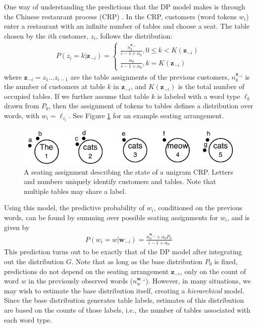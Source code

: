 \documentclass[11pt]{article}
\begin{document}
One way of understanding the predictions that the DP model makes is through the Chinese restaurant process (CRP)
\cite{aldous85}. 
In the CRP, customers (word tokens $w_i$) enter a restaurant with an infinite number of tables and choose a seat.  
The table chosen by the $i$th customer, $z_i$, follows the distribution:
\begin{align}
\nonumber P(z_i = k | \mathbf{z}_{-i}) = \left\{ 
\begin{array}{ll} 
  \frac{n_k^{\mathbf{z}_{-i}}}{i - 1 + \alpha_0}, 0 \leq k < K(\mathbf{z}_{-i}) \\
  \frac{\alpha_0}{i - 1 + \alpha_0}, k = K(\mathbf{z}_{-i})
\end{array} \right.
\label{eqn:crp}
\end{align}
where $\mathbf{z}_{-i} = z_1 \dots z_{i-1}$ are the table assignments of the previous customers, $n_k^{\mathbf{z}_{-i}}$ is the number of customers at table $k$ in ${\mathbf{z}_{-i}}$, and $K(\mathbf{z}_{-i})$ is
the total number of occupied tables.  
If we further assume that table $k$ is labeled with a word type $\ell_k$ drawn from $P_0$, then the assignment of tokens to tables defines a distribution over words, with $w_i = \ell_{z_i}$.
See Figure \ref{fig:tables} for an example seating arrangement.  

\begin{figure}
\begin{center}
\includegraphics[width=1.0\columnwidth]{tables.pdf}
\end{center}
\caption[]{A seating assignment describing the state of a unigram CRP. Letters and numbers uniquely identify customers and tables. Note that multiple tables may share a label.}
\label{fig:tables}
\end{figure}


Using this model, the predictive probability of $w_i$, conditioned on
the previous words, can be found by summing over possible seating
assignments for $w_i$, and is given by
\begin{align}
P(w_i = w | \mathbf{w}_{-i}) = \frac{n_{w}^{\mathbf{w}_{-i}} + \alpha_0 P_0}{i-1 + \alpha_0}
\end{align}
This prediction turns out to be exactly that of the DP model after integrating out the distribution $G$.  
Note that as long as the base distribution $P_0$ is fixed, predictions do not depend on the seating arrangement $\mathbf{z}_{-i}$, only on the count of word $w$ in the previously observed words ($n_{w}^{\mathbf{w}_{-i}}$).  
However, in many situations, we may wish to estimate the base distribution itself, creating a {\em hierarchical} model.  
Since the base distribution generates table labels, estimates of this distribution are based on the counts of those labels, i.e., the number of tables associated with each word type.
\end{document}
